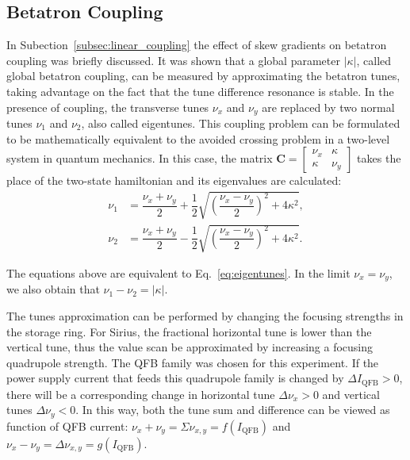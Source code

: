 \subsection{Betatron Coupling}
In Subection~\ref{subsec:linear_coupling} the effect of skew gradients on betatron coupling was briefly discussed. It was shown that a global parameter $|\kappa|$, called global betatron coupling, can be measured by approximating the betatron tunes, taking advantage on the fact that the tune difference resonance is stable. In the presence of coupling, the transverse tunes $\nu_x$ and $\nu_y$ are replaced by two normal tunes $\nu_1$ and $\nu_2$, also called eigentunes. This coupling problem can be formulated to be mathematically equivalent to the avoided crossing problem in a two-level system in quantum mechanics. In this case, the matrix $\mathbf{C} = \begin{bmatrix} \nu_x & \kappa \\ \kappa & \nu_y \end{bmatrix}$ takes the place of the two-state hamiltonian and its eigenvalues are calculated:
\begin{align}
    \nu_1 &= \dfrac{\nu_x + \nu_y}{2} + \dfrac{1}{2}\sqrt{\left(\dfrac{\nu_x - \nu_y}{2}\right)^2 + 4 \kappa^2}, \\
    \nu_2 &= \dfrac{\nu_x + \nu_y}{2} - \dfrac{1}{2}\sqrt{\left(\dfrac{\nu_x - \nu_y}{2}\right)^2 + 4 \kappa^2}.
    \label{eq:normal_tunes}
\end{align}

The equations above are equivalent to Eq.~\eqref{eq:eigentunes}. In the limit $\nu_x = \nu_y$, we also obtain that $\nu_1 - \nu_2 = |\kappa|$.

The tunes approximation can be performed by changing the focusing strengths in the storage ring. For Sirius, the fractional horizontal tune is lower than the vertical tune, thus the value scan be approximated by increasing a focusing quadrupole strength. The QFB family was chosen for this experiment. If the power supply current that feeds this quadrupole family is changed by $\Delta I_{\mathrm{QFB}}>0$, there will be a corresponding change in horizontal tune $\Delta\nu_x > 0$ and vertical tunes $\Delta\nu_y < 0$. In this way, both the tune sum and difference can be viewed as function of QFB current: $\nu_x + \nu_y = \Sigma \nu_{x, y} = f\left(I_{\mathrm{QFB}}\right)$ and $\nu_x - \nu_y = \Delta \nu_{x, y} = g\left(I_{\mathrm{QFB}}\right)$.

